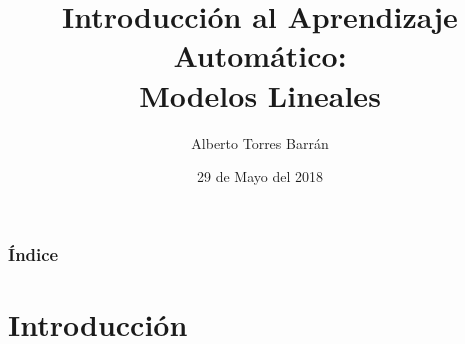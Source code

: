 \documentclass{beamer}
\title{Introducción al Aprendizaje Automático:\\ Modelos Lineales}
\author{Alberto Torres Barrán}
\date{29 de Mayo del 2018}
\begin{document}
\begin{frame}[plain]
\titlepage
\end{frame}

\begin{frame}
	\frametitle{Índice}
    \tableofcontents
\end{frame}


\section{Introducción}

%
%
%
%
%
%
%
\end{document}
